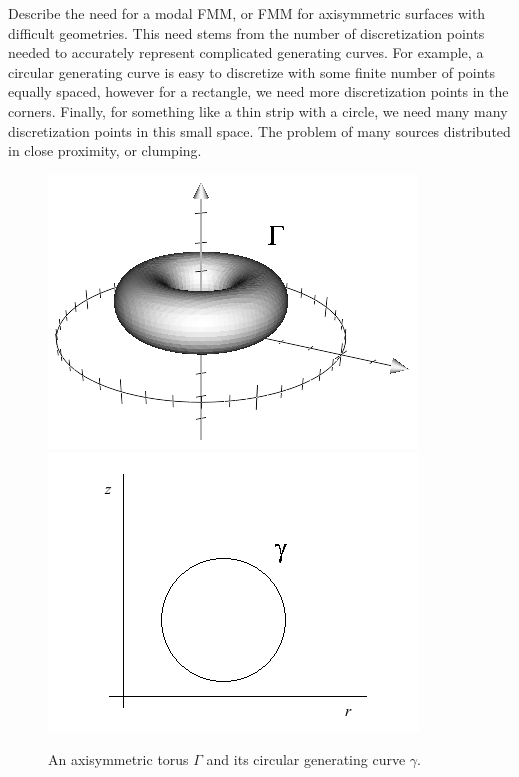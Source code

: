 \documentclass[11pt, oneside]{article}   	%
\begin{document}
Describe the need for a modal FMM, or FMM for axisymmetric surfaces with difficult geometries. This need stems from the number of discretization points needed to accurately represent complicated generating curves. For example, a circular generating curve is easy to discretize with some finite number of points equally spaced, however for a rectangle, we need more discretization points in the corners. Finally, for something like a thin strip with a circle, we need many many discretization points in this small space. The problem of many sources distributed in close proximity, or clumping.
\begin{figure}[h]
\caption{An axisymmetric torus $\Gamma$ and its circular generating curve $\gamma$.}
\label{fig:2}
\centering
\includegraphics[scale=0.5]{torus}
\includegraphics[scale=0.5]{circle}
\end{figure}
\end{document}

